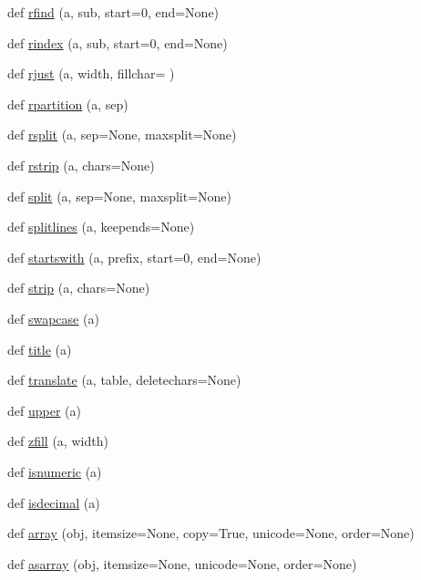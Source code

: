 \begin{DoxyCompactItemize}
\item 
def \hyperlink{namespacenumpy_1_1core_1_1defchararray_ac13bd790bc70787c8d77bec668ac20ba}{rfind} (a, sub, start=0, end=None)
\item 
def \hyperlink{namespacenumpy_1_1core_1_1defchararray_a38613efaaf43c989ff9efcdeca853e7d}{rindex} (a, sub, start=0, end=None)
\item 
def \hyperlink{namespacenumpy_1_1core_1_1defchararray_a41e0bf72752b8abe1e6d967b788a1218}{rjust} (a, width, fillchar=\textquotesingle{} \textquotesingle{})
\item 
def \hyperlink{namespacenumpy_1_1core_1_1defchararray_a1a8c15b7c697eeb18a01fa9627882410}{rpartition} (a, sep)
\item 
def \hyperlink{namespacenumpy_1_1core_1_1defchararray_ab29985f10b611ee504322e8a0fc69f0e}{rsplit} (a, sep=None, maxsplit=None)
\item 
def \hyperlink{namespacenumpy_1_1core_1_1defchararray_a39cd3d5901f81898ef004dedfa8c386c}{rstrip} (a, chars=None)
\item 
def \hyperlink{namespacenumpy_1_1core_1_1defchararray_a11dc6218a2920f5f41979d00bd53efd5}{split} (a, sep=None, maxsplit=None)
\item 
def \hyperlink{namespacenumpy_1_1core_1_1defchararray_ab865acc98bccc2ddd4d8f9beab311e0a}{splitlines} (a, keepends=None)
\item 
def \hyperlink{namespacenumpy_1_1core_1_1defchararray_aabfa1a91c6b9cdda53ba0255e5f2690d}{startswith} (a, prefix, start=0, end=None)
\item 
def \hyperlink{namespacenumpy_1_1core_1_1defchararray_a1b994662128d82614276bf46e2b1b2a8}{strip} (a, chars=None)
\item 
def \hyperlink{namespacenumpy_1_1core_1_1defchararray_af9c376c776da12e27a440f6a927adea9}{swapcase} (a)
\item 
def \hyperlink{namespacenumpy_1_1core_1_1defchararray_a8709b46f8e613f43e2827ffa2745b6fc}{title} (a)
\item 
def \hyperlink{namespacenumpy_1_1core_1_1defchararray_ac68b62aa07c4bbb98e1d968ce2d97514}{translate} (a, table, deletechars=None)
\item 
def \hyperlink{namespacenumpy_1_1core_1_1defchararray_afb7414dad44f9274628b24601c47f06e}{upper} (a)
\item 
def \hyperlink{namespacenumpy_1_1core_1_1defchararray_aa2c9a3e98b7b09a6faf12b574cf4c51b}{zfill} (a, width)
\item 
def \hyperlink{namespacenumpy_1_1core_1_1defchararray_ad919f4a6ecf5a64a8d5e8cbd69db1551}{isnumeric} (a)
\item 
def \hyperlink{namespacenumpy_1_1core_1_1defchararray_ac31769a84ca9653b41de60d7d890631f}{isdecimal} (a)
\item 
def \hyperlink{namespacenumpy_1_1core_1_1defchararray_a9b0cb9668790067620e1e48968020872}{array} (obj, itemsize=None, copy=True, unicode=None, order=None)
\item 
def \hyperlink{namespacenumpy_1_1core_1_1defchararray_a57c79838261fef885ef869fbb5a0330b}{asarray} (obj, itemsize=None, unicode=None, order=None)
\end{DoxyCompactItemize}

